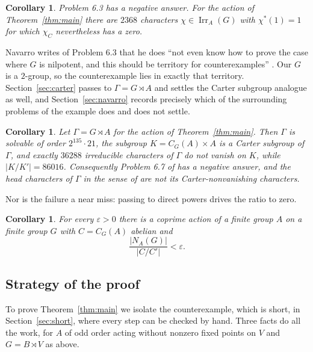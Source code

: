 \documentclass[11pt]{article}
\newtheorem{lettercorollary}[lettertheorem]{Corollary}
\theoremstyle{definition}
\theoremstyle{remark}
\newcommand{\Irr}{\operatorname{Irr}}
\begin{document}
\begin{lettercorollary}\label{cor:criterion}
Problem 6.3 has a negative answer.  For the action of
Theorem~\ref{thm:main} there are $2368$ characters $\chi\in\Irr_A(G)$
with $\chi^*(1)=1$ for which $\chi_C$ nevertheless has a zero.
\end{lettercorollary}

Navarro writes of Problem 6.3 that he does ``not even know how to prove
the case where $G$ is nilpotent, and this should be territory for
counterexamples'' \cite[p.~189]{navarro-problems}.  Our $G$ is a
$2$-group, so the counterexample lies in exactly that territory.
Section~\ref{sec:carter} passes to $\Gamma=G\rtimes A$ and settles
the Carter subgroup analogue as well, and Section~\ref{sec:navarro}
records precisely which of the surrounding problems of
\cite{navarro-problems} the example does and does not settle.

\begin{lettercorollary}\label{cor:carter-intro}
Let $\Gamma=G\rtimes A$ for the action of Theorem~\ref{thm:main}.  Then
$\Gamma$ is solvable of order $2^{135}\cdot21$, the subgroup
$K=C_G(A)\times A$ is a Carter subgroup of $\Gamma$, and exactly
$36288$ irreducible characters of $\Gamma$ do not vanish on $K$, while
$|K/K'|=86016$.  Consequently Problem 6.7 of \cite{navarro-problems} has
a negative answer, and the head characters of $\Gamma$ in the sense of
\cite{isaacs-carter} are not its Carter-nonvanishing characters.
\end{lettercorollary}

Nor is the failure a near miss: passing to direct powers drives the
ratio to zero.

\begin{lettercorollary}\label{cor:powers}
For every $\varepsilon>0$ there is a coprime action of a finite group
$A$ on a finite group $G$ with $C=C_G(A)$ abelian and
\[
 \frac{|N_A(G)|}{|C/C'|}<\varepsilon .
\]
\end{lettercorollary}

\subsection*{Strategy of the proof}

To prove Theorem~\ref{thm:main} we isolate the counterexample, which is
short, in Section~\ref{sec:short}, where every step can be checked by
hand.  Three facts do all the work, for $A$ of odd order acting without
nonzero fixed points on $V$ and $G=B\rtimes V$ as above.
\end{document}
